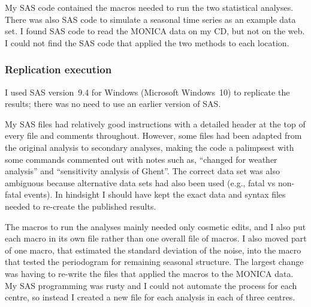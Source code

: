 My SAS code contained the macros needed to run the two statistical analyses. There was also SAS code to simulate a seasonal time series as an example data set. I found SAS code to read the MONICA data on my CD, but not on the web. I could not find the SAS code that applied the two methods to each location.


\subsubsection{Replication execution}

I used SAS version~9.4 for Windows (Microsoft Windows~10) to replicate the results; there was no need to use an earlier version of SAS. 

My SAS files had relatively good instructions with a detailed header at the top of every file and comments throughout. However, some files had been adapted from the original analysis to secondary analyses, making the code a palimpsest with some commands commented out with notes such as, ``changed for weather analysis'' and ``sensitivity analysis of Ghent''. The correct data set was also ambiguous because alternative data sets had also been used (e.g., fatal vs non-fatal events).  In hindsight I should have kept the exact data and syntax files needed to re-create the published results.

The macros to run the analyses mainly needed only cosmetic edits, and I also put each macro in its own file rather than one overall file of macros. I also moved part of one macro, that estimated the standard deviation of the noise, into the macro that tested the periodogram for remaining seasonal structure. The largest change was having to re-write the files that applied the macros to the MONICA data. My SAS programming was rusty and I could not automate the process for each centre, so instead I created a new file for each analysis in each of three centres.


